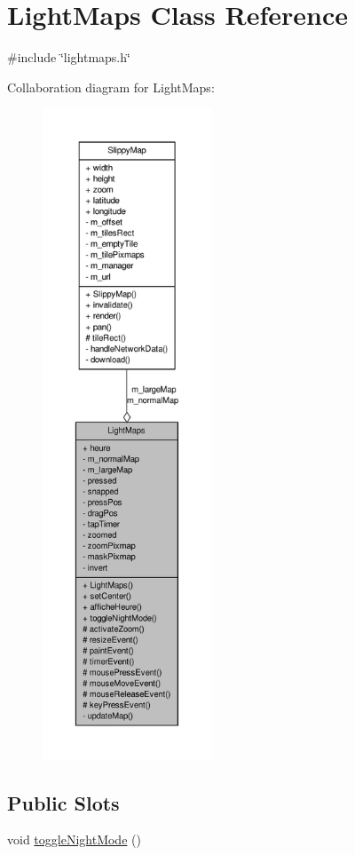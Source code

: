 \hypertarget{classLightMaps}{\section{Light\-Maps Class Reference}
\label{classLightMaps}
}


{\ttfamily \#include \char`\"{}lightmaps.\-h\char`\"{}}



Collaboration diagram for Light\-Maps\-:\nopagebreak
\begin{figure}[H]
\begin{center}
\leavevmode
\includegraphics[height=550pt]{classLightMaps__coll__graph}
\end{center}
\end{figure}
\subsection*{Public Slots}
\begin{DoxyCompactItemize}
\item 
void \hyperlink{classLightMaps_a231905fb3ab4d3d488a64f3ac3bba7a3}{toggle\-Night\-Mode} ()
\end{DoxyCompactItemize}
